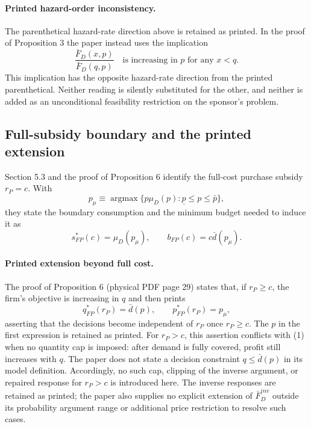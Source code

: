 \documentclass{article}
\begin{document}
\paragraph{Printed hazard-order inconsistency.}
The parenthetical hazard-rate direction above is retained as printed. In the proof of Proposition 3 the paper instead uses the implication
\[
\frac{\bar F_D(x,p)}{\bar F_D(q,p)}
\quad\text{is increasing in $p$ for any $x<q$}.
\]
This implication has the opposite hazard-rate direction from the printed parenthetical. Neither reading is silently substituted for the other, and neither is added as an unconditional feasibility restriction on the sponsor's problem.

\subsection*{Full-subsidy boundary and the printed extension}

Section 5.3 and the proof of Proposition 6 identify the full-cost purchase subsidy $r_P=c$. With
\[
p_\mu\equiv\operatorname*{argmax}
\{p\mu_D(p):\underline p\leq p\leq\bar p\},
\]
they state the boundary consumption and the minimum budget needed to induce it as
\[
s_{FP}^{*}(c)=\mu_D(p_\mu),\qquad
b_{FP}(c)=c\bar d(p_\mu).
\]

\paragraph{Printed extension beyond full cost.}
The proof of Proposition 6 (physical PDF page 29) states that, if $r_P\geq c$, the firm's objective is increasing in $q$ and then prints
\[
q_{FP}^{*}(r_P)=\bar d(p),\qquad
p_{FP}^{*}(r_P)=p_\mu,
\]
asserting that the decisions become independent of $r_P$ once $r_P\geq c$. The $p$ in the first expression is retained as printed. For $r_P>c$, this assertion conflicts with (1) when no quantity cap is imposed: after demand is fully covered, profit still increases with $q$. The paper does not state a decision constraint $q\leq\bar d(p)$ in its model definition. Accordingly, no such cap, clipping of the inverse argument, or repaired response for $r_P>c$ is introduced here. The inverse responses are retained as printed; the paper also supplies no explicit extension of $\bar F_D^{inv}$ outside its probability argument range or additional price restriction to resolve such cases.
\end{document}
